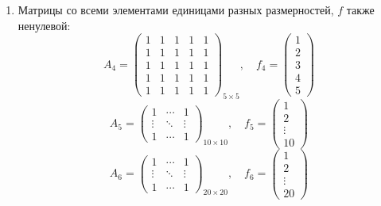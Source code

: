 \begin{enumerate}
  \item Матрицы со всеми элементами единицами разных размерностей, \( f \) также ненулевой:
  \[
    A_4=\begin{pmatrix} 1 & 1 & 1 & 1 & 1 \\ 1 & 1 & 1 & 1 & 1 \\ 1 & 1 & 1 & 1 & 1 \\ 1 & 1 & 1 & 1 & 1 \\ 1 & 1 & 1 & 1 & 1 \end{pmatrix}_{5 \times 5}, \quad f_4=\begin{pmatrix} 1 \\ 2 \\ 3 \\ 4 \\ 5 \end{pmatrix}
  \]
  \[
    A_5=\begin{pmatrix} 1 & \cdots & 1 \\ \vdots & \ddots & \vdots \\ 1 & \cdots & 1 \end{pmatrix}_{10 \times 10}, \quad f_5=\begin{pmatrix} 1 \\ 2 \\ \vdots \\ 10 \end{pmatrix}
  \]
  \[
    A_6=\begin{pmatrix} 1 & \cdots & 1 \\ \vdots & \ddots & \vdots \\ 1 & \cdots & 1 \end{pmatrix}_{20 \times 20}, \quad f_6=\begin{pmatrix} 1 \\ 2 \\ \vdots \\ 20 \end{pmatrix}
  \]
  

\end{enumerate}
